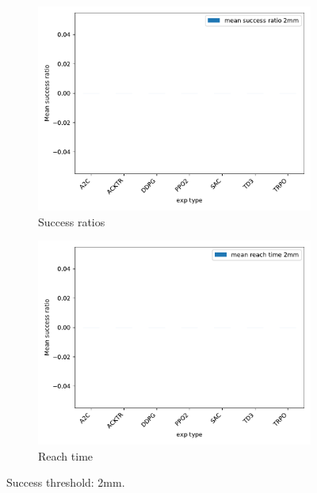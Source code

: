 \documentclass{article}
\begin{document}
\begin{figure}[H]
\centering
\begin{subfigure}{0.49\textwidth}
  \centering
  \includegraphics[width=\textwidth]{../success_2mm.pdf}
  \caption{Success ratios} 
\end{subfigure}
\begin{subfigure}{0.49\textwidth}
  \centering
  \includegraphics[width=\textwidth]{../reachtime_2mm.pdf} 
  \caption{Reach time}
\end{subfigure}
\caption{Success threshold: 2mm.}
\end{figure}
\end{document}
